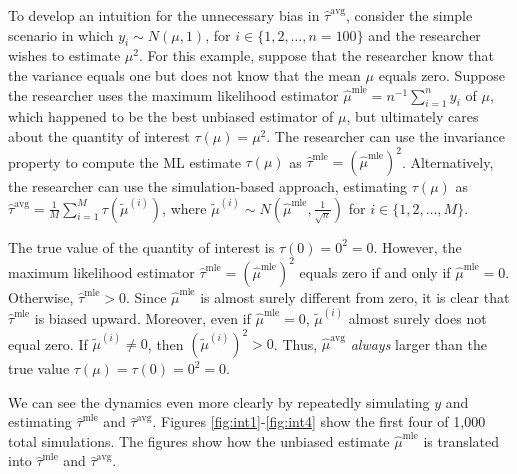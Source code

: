 \documentclass[11pt]{article}
\begin{document}
To develop an intuition for the unnecessary bias in $\hat{\tau}^\text{avg}$, consider the simple scenario in which $y_i \sim N(\mu, 1)$, for $i \in \{1, 2, \ldots, n = 100\}$ and the researcher wishes to estimate $\mu^2$.
For this example, suppose that the researcher know that the variance equals one but does not know that the mean $\mu$ equals zero.
Suppose the researcher uses the maximum likelihood estimator $\hat{\mu}^\text{mle} = n^{-1}\sum_{i=1}^n y_i$ of $\mu$, which happened to be the best unbiased estimator of $\mu$, but ultimately cares about the quantity of interest $\tau(\mu) = \mu^2$.
The researcher can use the invariance property to compute the ML estimate $\tau(\mu)$ as $\hat{\tau}^\text{mle} = \left( \hat{\mu}^\text{mle} \right) ^2$.
Alternatively, the researcher can use the simulation-based approach, estimating $\tau(\mu)$ as $\hat{\tau}^\text{avg} = \frac{1}{M} \sum_{i = 1}^M \tau \left( \tilde{\mu}^{(i)} \right)$, where $\tilde{\mu}^{(i)} \sim N \left( \hat{\mu}^\text{mle}, \frac{1}{\sqrt{n}} \right)$ for $i \in \{1, 2,\ldots, M\}$.

The true value of the quantity of interest is $\tau(0) = 0^2 = 0$.
However, the maximum likelihood estimator $\hat{\tau}^\text{mle} = \left( \hat{\mu}^\text{mle} \right)^2$ equals zero if and only if $\hat{\mu}^\text{mle} = 0$.
Otherwise, $\hat{\tau}^\text{mle} > 0$.
Since $\hat{\mu}^\text{mle}$ is almost surely different from zero, it is clear that $\hat{\tau}^\text{mle}$ is biased upward.
Moreover, even if $\hat{\mu}^\text{mle} = 0$, $\tilde{\mu}^{(i)}$ almost surely does not equal zero.
If $\tilde{\mu}^{(i)} \neq 0$, then $\left( \tilde{\mu}^{(i)} \right)^2 > 0$.
Thus, $\hat{\mu}^\text{avg}$ \textit{always} larger than the true value $\tau(\mu) = \tau(0) = 0^2 = 0$.

We can see the dynamics even more clearly by repeatedly simulating $y$ and estimating $\hat{\tau}^\text{mle}$ and $\hat{\tau}^\text{avg}$.
Figures \ref{fig:int1}-\ref{fig:int4} show the first four of 1,000 total simulations.
The figures show how the unbiased estimate $\hat{\mu}^\text{mle}$ is translated into $\hat{\tau}^\text{mle}$ and $\hat{\tau}^\text{avg}$.
\end{document}
